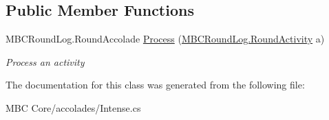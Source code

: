 \subsection*{Public Member Functions}
\begin{DoxyCompactItemize}
\item 
\hypertarget{class_m_b_c_core_1_1mbc_1_1accolades_1_1_intense_a1431bcea6e2fbb999d9585337188d4db}{M\-B\-C\-Round\-Log.\-Round\-Accolade \hyperlink{class_m_b_c_core_1_1mbc_1_1accolades_1_1_intense_a1431bcea6e2fbb999d9585337188d4db}{Process} (\hyperlink{class_m_b_c_core_1_1_m_b_c_round_log_1_1_round_activity}{M\-B\-C\-Round\-Log.\-Round\-Activity} a)}\label{class_m_b_c_core_1_1mbc_1_1accolades_1_1_intense_a1431bcea6e2fbb999d9585337188d4db}

\begin{DoxyCompactList}\small\item\em Process an activity\end{DoxyCompactList}\end{DoxyCompactItemize}


The documentation for this class was generated from the following file\-:\begin{DoxyCompactItemize}
\item 
M\-B\-C Core/accolades/Intense.\-cs\end{DoxyCompactItemize}
